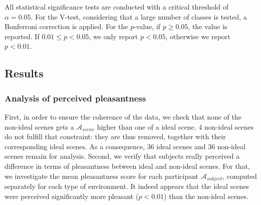 \documentclass[12pt]{elsarticle}
\begin{document}
All statistical significance tests are conducted with a critical threshold of $\alpha=0.05$. For the V-test, considering that a large number of classes is tested, a Bonferroni correction is applied. For the $p$-value, if $p\geq0.05$, the value is reported. If $0.01\leq p<0.05$, we only report $p<0.05$, otherwise we report $p<0.01$.


\subsection{Results}

\subsubsection*{Analysis of perceived pleasantness}


First, in order to ensure the coherence of the data, we check that none of the non-ideal scenes gets a $\mathcal{A}_{scene}$ higher than one of a ideal scene. 4 non-ideal scenes do not fulfill that constraint: they are thus removed, together with their corresponding ideal scenes. As a consequence, 36 ideal scenes and 36 non-ideal scenes remain for analysis. Second, we verify that subjects really perceived a difference in terms of pleasantness between ideal and non-ideal scenes. For that, we investigate the mean pleasantness score for each participant $\mathcal{A}_{subject}$, computed separately for each type of environment. It indeed appears that the ideal scenes were perceived significantly more pleasant ($p<0.01$) than the non-ideal scenes.
\end{document}

